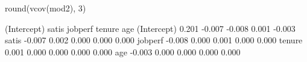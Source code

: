 \begin{Schunk}
\begin{Sinput}
 round(vcov(mod2), 3)
\end{Sinput}
\begin{Soutput}
            (Intercept)  satis jobperf tenure    age
(Intercept)       0.201 -0.007  -0.008  0.001 -0.003
satis            -0.007  0.002   0.000  0.000  0.000
jobperf          -0.008  0.000   0.001  0.000  0.000
tenure            0.001  0.000   0.000  0.000  0.000
age              -0.003  0.000   0.000  0.000  0.000
\end{Soutput}
\end{Schunk}
